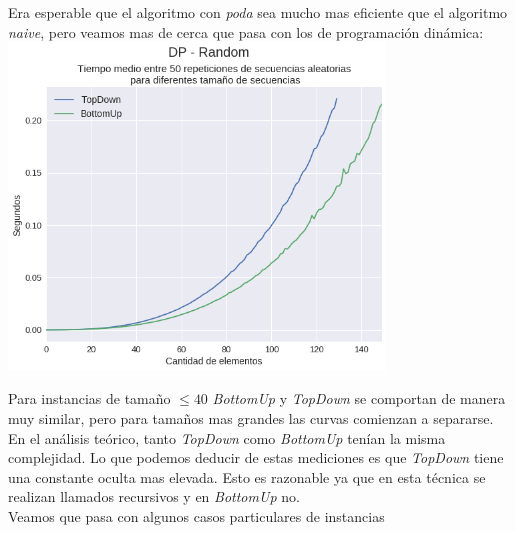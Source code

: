 Era esperable que el algoritmo con \textit{poda} sea mucho mas eficiente que el algoritmo \textit{naive}, pero veamos mas de cerca que pasa con los de programación dinámica: \\

{\centering
  \includegraphics[width=0.75\textwidth]{informe/img/experimentos/dp-random.png} \\
}

Para instancias de tamaño $\leq 40$ \textit{BottomUp} y \textit{TopDown} se comportan de manera muy similar, pero para tamaños mas grandes las curvas comienzan a separarse. \\

En el análisis teórico, tanto \textit{TopDown} como \textit{BottomUp} tenían la misma complejidad. Lo que podemos deducir de estas mediciones es que \textit{TopDown} tiene una constante oculta mas elevada. Esto es razonable ya que en esta técnica se realizan llamados recursivos y en \textit{BottomUp} no. \\

Veamos que pasa con algunos casos particulares de instancias